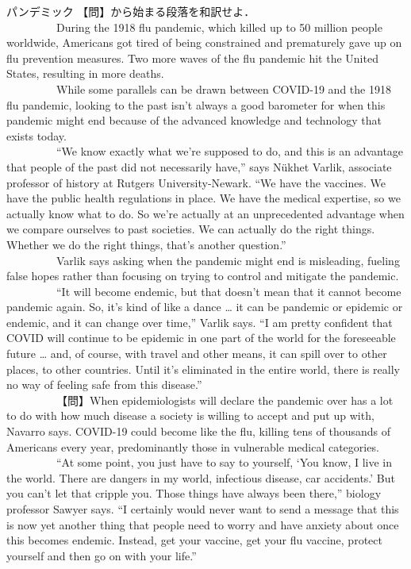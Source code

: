 \documentclass[b4paper,fleqn,dvipdfmx]{jsarticle}
\begin{document}
\begin{itembox}[l]{パンデミック}
【問】から始まる段落を和訳せよ．\\
\ \ \ \ \ \ \ \ \ During the 1918 flu pandemic, which killed up to 50 million people worldwide, Americans got tired of being constrained and prematurely gave up on flu prevention measures. Two more waves of the flu pandemic hit the United States, resulting in more deaths.\\
\ \ \ \ \ \ \ \ \ While some parallels can be drawn between COVID-19 and the 1918 flu pandemic, looking to the past isn’t always a good barometer for when this pandemic might end because of the advanced knowledge and technology that exists today.\\
\ \ \ \ \ \ \ \ \ “We know exactly what we're supposed to do, and this is an advantage that people of the past did not necessarily have,” says Nükhet Varlik, associate professor of history at Rutgers University-Newark. “We have the vaccines. We have the public health regulations in place. We have the medical expertise, so we actually know what to do. So we're actually at an unprecedented advantage when we compare ourselves to past societies. We can actually do the right things. Whether we do the right things, that’s another question.”\\
\ \ \ \ \ \ \ \ \ Varlik says asking when the pandemic might end is misleading, fueling false hopes rather than focusing on trying to control and mitigate the pandemic.\\
\ \ \ \ \ \ \ \ \ “It will become endemic, but that doesn't mean that it cannot become pandemic again. So, it's kind of like a dance … it can be pandemic or epidemic or endemic, and it can change over time,” Varlik says. “I am pretty confident that COVID will continue to be epidemic in one part of the world for the foreseeable future … and, of course, with travel and other means, it can spill over to other places, to other countries. Until it's eliminated in the entire world, there is really no way of feeling safe from this disease.”\\
\ \ \ \ \ \ \ \ \ 【問】When epidemiologists will declare the pandemic over has a lot to do with how much disease a society is willing to accept and put up with, Navarro says. COVID-19 could become like the flu, killing tens of thousands of Americans every year, predominantly those in vulnerable medical categories.\\
\ \ \ \ \ \ \ \ \ “At some point, you just have to say to yourself, ‘You know, I live in the world. There are dangers in my world, infectious disease, car accidents.’ But you can't let that cripple you. Those things have always been there,” biology professor Sawyer says. “I certainly would never want to send a message that this is now yet another thing that people need to worry and have anxiety about once this becomes endemic. Instead, get your vaccine, get your flu vaccine, protect yourself and then go on with your life.”

\end{itembox}
\end{document}
